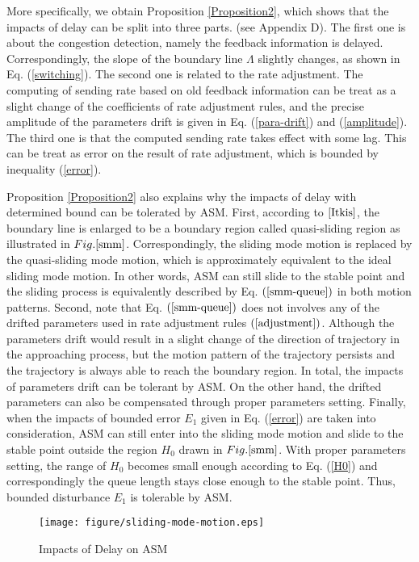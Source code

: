 \documentclass{sig-alternate-10pt}
\def\figurename{Fig.}
\begin{document}
More specifically, we obtain Proposition \ref{Proposition2}, which shows that the impacts of delay can be split into three parts. (see Appendix D). The first one is about the congestion detection, namely the feedback information is delayed. Correspondingly, the slope of the boundary line $\Lambda$ slightly changes, as shown in Eq. (\ref{switching}). The second one is related to the rate adjustment. The computing of sending rate based on old feedback information can be treat as a slight change of the coefficients of rate adjustment rules, and the precise amplitude of the parameters drift is given in Eq. (\ref{para-drift}) and (\ref{amplitude}). The third one is that the computed sending rate takes effect with some lag. This can be treat as error on the result of rate adjustment, which is bounded by inequality (\ref{error}).

Proposition \ref{Proposition2} also explains why the impacts of delay with determined bound can be tolerated by ASM. First, according to $\cite{Itkis}$, the boundary line is enlarged to be a boundary region called quasi-sliding region as illustrated in $\figurename{\ref{smm}}$. Correspondingly, the sliding mode motion is replaced by the quasi-sliding mode motion, which is approximately equivalent to the ideal sliding mode motion. In other words, ASM can still slide to the stable point and the sliding process is equivalently described by Eq. $(\ref{smm-queue})$ in both motion patterns. Second, note that Eq. $(\ref{smm-queue})$ does not involves any of the drifted parameters used in rate adjustment rules $(\ref{adjustment})$. Although the parameters drift would result in a slight change of the direction of trajectory in the approaching process, but the motion pattern of the trajectory persists and the trajectory is always able to reach the boundary region. In total, the impacts of parameters drift can be tolerant by ASM. On the other hand, the drifted parameters can also be compensated through proper parameters setting. Finally, when the impacts of bounded error $E_1$ given in Eq. (\ref{error}) are taken into consideration, ASM can still enter into the sliding mode motion and slide to the stable point outside the region $H_0$ drawn in $\figurename{\ref{smm}}$. With proper parameters setting, the range of $H_0$ becomes small enough according to Eq. (\ref{H0}) and correspondingly the queue length stays close enough to the stable point. Thus, bounded disturbance $E_1$ is tolerable by ASM. 

\begin{figure}
\centering 
\texttt{[image: figure/sliding-mode-motion.eps]}
\caption{Impacts of Delay on ASM}
\label{smm}
\end{figure}
\end{document}
